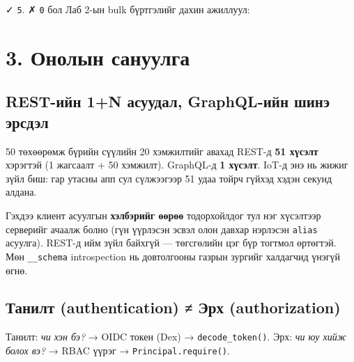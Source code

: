 ✓ \texttt{5}. ✗ \texttt{0} бол Лаб 2-ын bulk бүртгэлийг дахин ажиллуул:

\begin{Shaded}
\begin{Highlighting}[]
\end{Highlighting}
\end{Shaded}

\hypertarget{ux43eux43dux43eux43bux44bux43d-ux441ux430ux43dux443ux443ux43bux433ux430}{%
\section{3. Онолын сануулга}\label{ux43eux43dux43eux43bux44bux43d-ux441ux430ux43dux443ux443ux43bux433ux430}}

\hypertarget{rest-ux438ux439ux43d-1n-ux430ux441ux443ux443ux434ux430ux43b-graphql-ux438ux439ux43d-ux448ux438ux43dux44d-ux44dux440ux441ux434ux44dux43b}{%
\subsection{REST-ийн 1+N асуудал, GraphQL-ийн шинэ эрсдэл}\label{rest-ux438ux439ux43d-1n-ux430ux441ux443ux443ux434ux430ux43b-graphql-ux438ux439ux43d-ux448ux438ux43dux44d-ux44dux440ux441ux434ux44dux43b}}

50 төхөөрөмж бүрийн сүүлийн 20 хэмжилтийг авахад REST-д \textbf{51 хүсэлт} хэрэгтэй (1 жагсаалт + 50 хэмжилт). GraphQL-д \textbf{1 хүсэлт}. IoT-д энэ нь жижиг зүйл биш: гар утасны апп сул сүлжээгээр 51 удаа тойрч гүйхэд хэдэн секунд алдана.

Гэхдээ клиент асуулгын \textbf{хэлбэрийг өөрөө} тодорхойлдог тул нэг хүсэлтээр серверийг ачаалж болно (гүн үүрлэсэн эсвэл олон давхар нэрлэсэн \texttt{alias} асуулга). REST-д ийм зүйл байхгүй --- төгсгөлийн цэг бүр тогтмол өртөгтэй. Мөн \texttt{\_\allowbreak{}\_\allowbreak{}schema} introspection нь довтолгооны газрын зургийг халдагчид үнэгүй өгнө.

\hypertarget{ux442ux430ux43dux438ux43bux442-authentication-ux44dux440ux445-authorization}{%
\subsection{Танилт (authentication) ≠ Эрх (authorization)}\label{ux442ux430ux43dux438ux43bux442-authentication-ux44dux440ux445-authorization}}

Танилт: \emph{чи хэн бэ?} → OIDC токен (Dex) → \texttt{decode\_token()}.
Эрх: \emph{чи юу хийж болох вэ?} → RBAC үүрэг → \texttt{Principal.\allowbreak{}require()}.

